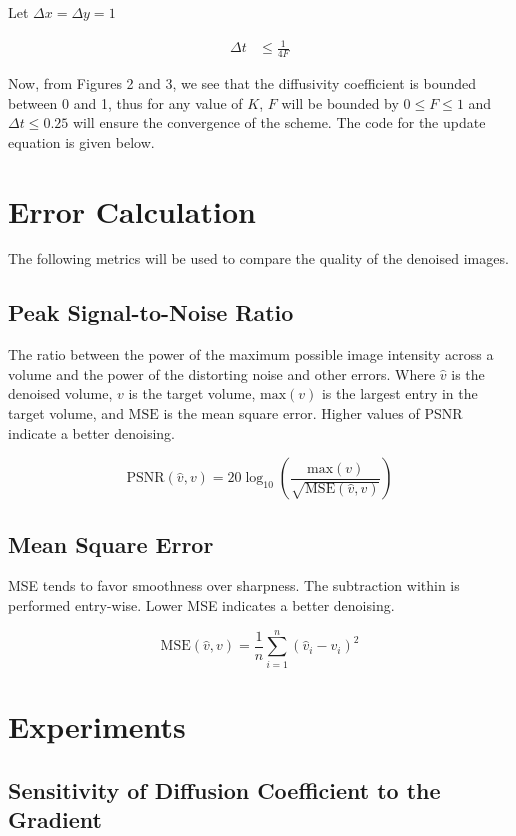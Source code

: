 \documentclass{article}
\begin{document}
Let \(\Delta x = \Delta y = 1\)

\begin{align}
\Delta t &\leq \frac{1}{4F}
\end{align}

Now, from Figures 2 and 3, we see that the diffusivity coefficient is bounded between 0 and 1, thus for any value of \( K \), \( F \) will be bounded by \( 0 \leq F \leq 1 \) and \( \Delta t \leq 0.25 \) will ensure the convergence of the scheme. The code for the update equation is given below.


\section{Error Calculation}
The following metrics will be used to compare the quality of the denoised images.

\subsection{Peak Signal-to-Noise Ratio}
The ratio between the power of the maximum possible image intensity across a volume and the power of the distorting noise and other errors. Where \( \hat{v} \) is the denoised volume, \( v \) is the target volume, \( \text{max}(v) \) is the largest entry in the target volume, and \( \text{MSE} \) is the mean square error. Higher values of PSNR indicate a better denoising.

\[
\text{PSNR}(\hat{v}, v) = 20 \log_{10} \left(\frac{\text{max}(v)}{\sqrt{\text{MSE}(\hat{v}, v)}}\right)
\]

\subsection{Mean Square Error}
MSE tends to favor smoothness over sharpness. The subtraction within is performed entry-wise. Lower MSE indicates a better denoising.

\[
\text{MSE}(\hat{v}, v) = \frac{1}{n} \sum_{i=1}^{n} (\hat{v}_i - v_i)^2
\]

\section{Experiments}

\subsection{Sensitivity of Diffusion Coefficient to the Gradient}
\end{document}
